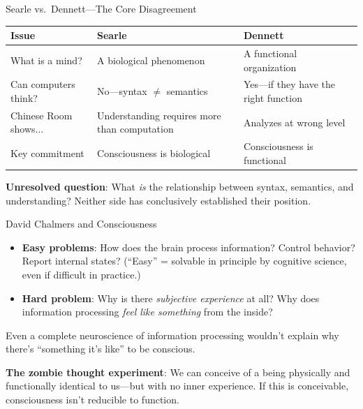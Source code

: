 ﻿\documentclass[aspectratio=169,11pt]{beamer}
\begin{document}
\begin{frame}{Searle vs.\ Dennett---The Core Disagreement}
\begin{table}[h]
\centering
\small
\begin{tabular}{@{}p{3.5cm}p{4.5cm}p{4.5cm}@{}}
\toprule
\textbf{Issue} & \textbf{Searle} & \textbf{Dennett} \\
\midrule
What is a mind? & A biological phenomenon & A functional organization \\
\addlinespace
Can computers think? & No---syntax $\neq$ semantics & Yes---if they have the right function \\
\addlinespace
Chinese Room shows... & Understanding requires more than computation & Analyzes at wrong level \\
\addlinespace
Key commitment & Consciousness is biological & Consciousness is functional \\
\bottomrule
\end{tabular}
\end{table}

\vspace{0.2em}
\textbf{Unresolved question}: What \emph{is} the relationship between syntax, semantics, and understanding? Neither side has conclusively established their position.
\end{frame}

\begin{frame}{David Chalmers and Consciousness}
\begin{conceptbox}
\small
\begin{itemize}
    \item \textbf{Easy problems}: How does the brain process information? Control behavior? Report internal states? (``Easy'' = solvable in principle by cognitive science, even if difficult in practice.)
    \item \textbf{Hard problem}: Why is there \emph{subjective experience} at all? Why does information processing \emph{feel like something} from the inside?
\end{itemize}
\end{conceptbox}

\vspace{0.3em}
Even a complete neuroscience of information processing wouldn't explain why there's ``something it's like'' to be conscious.

\vspace{0.3em}
\textbf{The zombie thought experiment}: We can conceive of a being physically and functionally identical to us---but with no inner experience. If this is conceivable, consciousness isn't reducible to function.
\end{frame}
\end{document}
